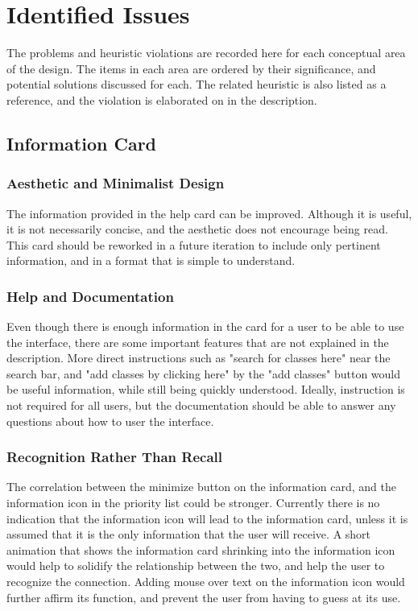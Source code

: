 \documentclass{article}
\begin{document}
\section{Identified Issues}

The problems and heuristic violations are recorded here for each conceptual area of the design. The items in each area are ordered by their significance, and potential solutions discussed for each. The related heuristic is also listed as a reference, and the violation is elaborated on in the description.

\subsection{Information Card}

\subsubsection{Aesthetic and Minimalist Design}
The information provided in the help card can be improved. Although it is useful, it is not necessarily concise, and the aesthetic does not encourage being read. This card should be reworked in a future iteration to include only pertinent information, and in a format that is simple to understand.

\subsubsection{Help and Documentation}
Even though there is enough information in the card for a user to be able to use the interface, there are some important features that are not explained in the description. More direct instructions such as "search for classes here" near the search bar, and "add classes by clicking here" by the "add classes" button would be useful information, while still being quickly understood. Ideally, instruction is not required for all users, but the documentation should be able to answer any questions about how to user the interface.

\subsubsection{Recognition Rather Than Recall}
The correlation between the minimize button on the information card, and the information icon in the priority list could be stronger. Currently there is no indication that the information icon will lead to the information card, unless it is assumed that it is the only information that the user will receive. A short animation that shows the information card shrinking into the information icon would help to solidify the relationship between the two, and help the user to recognize the connection. Adding mouse over text on the information icon would further affirm its function, and prevent the user from having to guess at its use.
\end{document}
